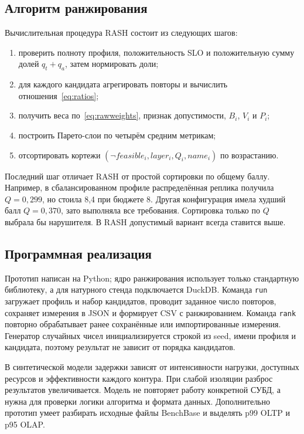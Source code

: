 \documentclass{misisarticle}
\begin{document}
\subsection{\textnormal{Алгоритм ранжирования}}

	Вычислительная процедура RASH состоит из следующих шагов:
\begin{enumerate}[leftmargin=*,label=\arabic*)]
	\item проверить полноту профиля, положительность SLO и положительную сумму долей $q_t+q_a$, затем нормировать доли;
	\item для каждого кандидата агрегировать повторы и вычислить отношения~\eqref{eq:ratios};
	\item получить веса по~\eqref{eq:rawweights}, признак допустимости, $B_i$, $V_i$ и $P_i$;
	\item построить Парето-слои по четырём средним метрикам;
	\item отсортировать кортежи $(\neg feasible_i, layer_i,Q_i,name_i)$ по возрастанию.
\end{enumerate}

	Последний шаг отличает RASH от простой сортировки по общему баллу. Например, в сбалансированном профиле распределённая реплика получила $Q=0{,}299$, но стоила 8{,}4 при бюджете 8. Другая конфигурация имела худший балл $Q=0{,}370$, зато выполняла все требования. Сортировка только по $Q$ выбрала бы нарушителя. В RASH допустимый вариант всегда ставится выше.

\subsection{\textnormal{Программная реализация}}

	Прототип написан на Python; ядро ранжирования использует только стандартную библиотеку, а для натурного стенда подключается DuckDB. Команда \texttt{run} загружает профиль и набор кандидатов, проводит заданное число повторов, сохраняет измерения в JSON и формирует CSV с ранжированием. Команда \texttt{rank} повторно обрабатывает ранее сохранённые или импортированные измерения. Генератор случайных чисел инициализируется строкой из seed, имени профиля и кандидата, поэтому результат не зависит от порядка кандидатов.

	В синтетической модели задержки зависят от интенсивности нагрузки, доступных ресурсов и эффективности каждого контура. При слабой изоляции разброс результатов увеличивается. Модель не повторяет работу конкретной СУБД, а нужна для проверки логики алгоритма и формата данных. Дополнительно прототип умеет разбирать исходные файлы BenchBase и выделять p99 OLTP и p95 OLAP.
\end{document}
